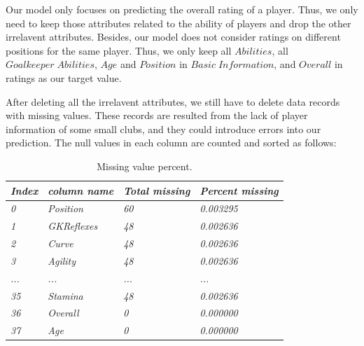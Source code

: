 \documentclass{article}
\begin{document}
\par Our model only focuses on predicting the overall rating of a player. Thus, we only need to keep those attributes related to the ability of players and drop the other irrelavent attributes. Besides, our model does not consider ratings on different positions for the same player. Thus, we only keep all $Abilities$, all $Goalkeeper\; Abilities$, $Age$ and $Position$ in $Basic\; Information$, and $Overall$ in ratings as our target value.

\par After deleting all the irrelavent attributes, we still have to delete data records with missing values. These records are resulted from the lack of player information of some small clubs, and they could introduce errors into our prediction. The null values in each column are counted and sorted as follows:

\begin{table}[]
\centering
\begin{tabular}{|l|l|l|l|}
\hline
\textit{Index} & \textit{column name}          & \textit{Total missing} & \textit{Percent missing} \\ \hline
\textit{0}     & \textit{Position}             & \textit{60}            & \textit{0.003295}        \\ \hline
\textit{1}     & \textit{GKReflexes}           & \textit{48}            & \textit{0.002636}        \\ \hline
\textit{2}     & \textit{Curve}                & \textit{48}            & \textit{0.002636}        \\ \hline
\textit{3}     & \textit{Agility}              & \textit{48}            & \textit{0.002636}        \\ \hline
\textit{...}   & \textit{...}                  & \textit{...}           & \textit{...}             \\ \hline
\textit{35}    & \textit{Stamina}              & \textit{48}            & \textit{0.002636}        \\ \hline
\textit{36}    & \textit{Overall}              & \textit{0}             & \textit{0.000000}        \\ \hline
\textit{37}    & \textit{Age}                  & \textit{0}             & \textit{0.000000}        \\ \hline
\end{tabular}
\caption{Missing value percent.}
\end{table}
\end{document}
